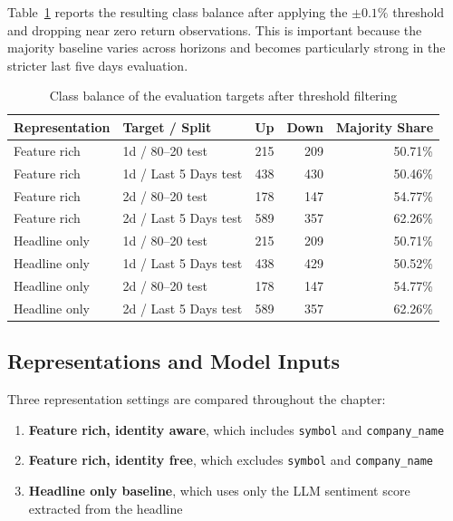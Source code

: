 Table~\ref{tab:class_balance} reports the resulting class balance after applying the $\pm 0.1\%$ threshold and dropping near zero return observations. This is important because the majority baseline varies across horizons and becomes particularly strong in the stricter last five days evaluation.

\begin{table}[htbp]
\centering
\caption{Class balance of the evaluation targets after threshold filtering}
\label{tab:class_balance}
\begin{tabular}{llrrr}
\hline
\textbf{Representation} & \textbf{Target / Split} & \textbf{Up} & \textbf{Down} & \textbf{Majority Share} \\
\hline
Feature rich & 1d / 80--20 test & 215 & 209 & 50.71\% \\
Feature rich & 1d / Last 5 Days test & 438 & 430 & 50.46\% \\
Feature rich & 2d / 80--20 test & 178 & 147 & 54.77\% \\
Feature rich & 2d / Last 5 Days test & 589 & 357 & 62.26\% \\
Headline only & 1d / 80--20 test & 215 & 209 & 50.71\% \\
Headline only & 1d / Last 5 Days test & 438 & 429 & 50.52\% \\
Headline only & 2d / 80--20 test & 178 & 147 & 54.77\% \\
Headline only & 2d / Last 5 Days test & 589 & 357 & 62.26\% \\
\hline
\end{tabular}
\end{table}

\subsection{Representations and Model Inputs}

Three representation settings are compared throughout the chapter:
\begin{enumerate}
    \item \textbf{Feature rich, identity aware}, which includes \texttt{symbol} and \texttt{company\_name}
    \item \textbf{Feature rich, identity free}, which excludes \texttt{symbol} and \texttt{company\_name}
    \item \textbf{Headline only baseline}, which uses only the LLM sentiment score extracted from the headline
\end{enumerate}

